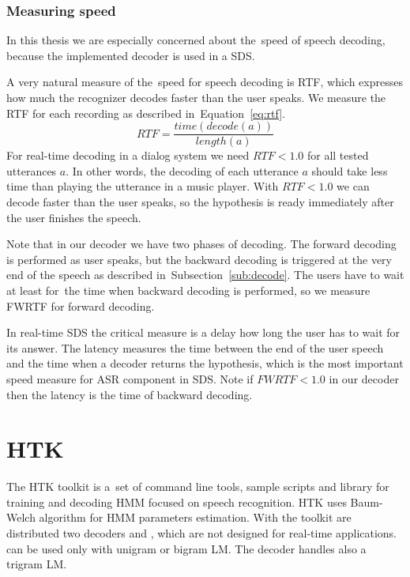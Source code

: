 {\subsubsection*{Measuring speed}
\label{sub:the_metrics_in_speech_recognition}
In this thesis we are especially concerned about the~speed of speech decoding,
because the implemented decoder is used in a \acl{SDS}.

A very natural measure of the~speed for speech decoding is \acl{RTF},
which expresses how much the recognizer decodes faster than the user speaks.
We measure the \ac{RTF} for each recording as described in~Equation~\ref{eq:rtf}.
\begin{equation}\label{eq:rtf}
    RTF = \frac{time(decode(a))}{length(a)}
\end{equation}
For real-time decoding in a dialog system we need $RTF < 1.0$ for all tested utterances $a$.
In other words, the decoding of each utterance $a$ should take less time than
playing the utterance in a music player.
With $RTF < 1.0$ we can decode faster than the user speaks, 
so the hypothesis is ready immediately after the user finishes the speech. 

Note that in our decoder we have two phases of decoding.
The forward decoding is performed as user speaks, but
the backward decoding is triggered at the very end of the speech
as described in~Subsection~\ref{sub:decode}.
The users have to wait at least for~the time when backward decoding is performed,
so we measure \ac{FWRTF} for forward decoding.

In real-time \ac{SDS} the critical measure is a delay how long the user
has to wait for its answer.
The latency measures the time between the end of the user speech and
the time when a decoder returns the hypothesis, 
which is the most important speed measure for \ac{ASR} component in \ac{SDS}.
Note if $FWRTF < 1.0 $ in our decoder then the latency is the time of backward decoding.


\section{\ac{HTK}}
\label{sec:back_htk}
The \ac{HTK} toolkit is a~set of command line tools, sample scripts and library
for training and decoding \ac{HMM} focused on speech recognition.
\ac{HTK} uses Baum-Welch algorithm for \ac{HMM} parameters estimation.
With the toolkit are distributed two decoders  and ,
which are not designed for real-time applications.
 can be used only with unigram or bigram \ac{LM}. 
The  decoder handles also a trigram \ac{LM}.

}
